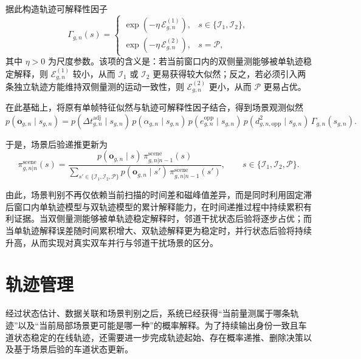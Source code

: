 \documentclass{xdupgthesis}
\begin{document}
据此构造轨迹可解释性因子
\begin{equation}
	\Gamma_{g,n}(s)
	=
	\begin{cases}
		\exp\!\left(-\eta\,\mathcal E_{g,n}^{(1)}\right),
		& s\in\{\mathcal I_1,\mathcal I_2\},\\[4pt]
		\exp\!\left(-\eta\,\mathcal E_{g,n}^{(2)}\right),
		& s=\mathcal P,
	\end{cases}
\end{equation}
其中 $\eta>0$ 为尺度参数。该项的含义是：若当前窗口内的双侧量测能够被单轨迹稳定解释，则 $\mathcal E_{g,n}^{(1)}$ 较小，从而 $\mathcal I_1$ 或 $\mathcal I_2$ 更易获得较大似然；反之，若必须引入两条独立轨迹方能维持双侧量测的运动一致性，则 $\mathcal E_{g,n}^{(2)}$ 更小，从而 $\mathcal P$ 更易占优。

在此基础上，将原有单帧特征似然与轨迹可解释性因子结合，得到场景观测似然
\begin{equation}
	p(\mathbf o_{g,n}\mid s_{g,n})
	=
	p(\Delta t_{g,n}^{\mathrm{adj}}\mid s_{g,n})\,
	p(\alpha_{g,n}\mid s_{g,n})\,
	p(e_{g,n}^{\mathrm{opp}}\mid s_{g,n})\,
	p(d_{g,n,\mathrm{opp}}^2\mid s_{g,n})\,
	\Gamma_{g,n}(s_{g,n}).
\end{equation}

于是，场景后验递推更新为
\begin{equation}
	\pi_{g,n|n}^{\mathrm{scene}}(s)
	=
	\frac{
		p(\mathbf o_{g,n}\mid s)\,
		\pi_{g,n|n-1}^{\mathrm{scene}}(s)
	}{
		\sum\limits_{s'\in\{\mathcal I_1,\mathcal I_2,\mathcal P\}}
		p(\mathbf o_{g,n}\mid s')\,
		\pi_{g,n|n-1}^{\mathrm{scene}}(s')
	},
	\qquad
	s\in\{\mathcal I_1,\mathcal I_2,\mathcal P\}.
\end{equation}

由此，场景判别不再仅依赖当前扫描的时间差和磁峰值差异，而是同时利用固定滞后窗口内单轨迹模型与双轨迹模型的累计解释能力，在时间递推过程中持续累积有利证据。当双侧量测能够被单轨迹稳定解释时，邻道干扰状态后验将逐步占优；而当单轨迹解释误差随时间累积增大、双轨迹解释更为稳定时，并行状态后验将持续升高，从而实现对真实双车并行与邻道干扰场景的区分。

\section{轨迹管理}
\label{sec:ch3_track_management}

经过状态估计、数据关联和场景判别之后，系统已经获得“当前量测属于哪条轨迹”以及“当前局部场景更可能是哪一种”的概率解释。为了持续输出身份一致且车道状态稳定的在线轨迹，还需要进一步完成轨迹起始、存在概率递推、删除决策以及基于场景后验的车道状态更新。
\end{document}
